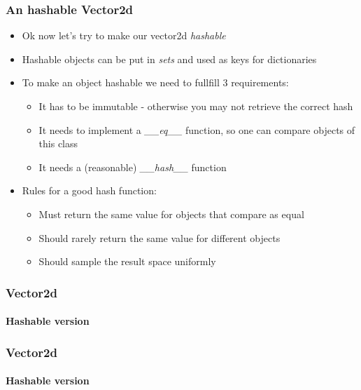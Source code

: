 \documentclass[9pt]{beamer}
\begin{document}
\begin{frame}
  \frametitle{An hashable Vector2d}

  \begin{itemize}
    \item Ok now let's try to make our vector2d \emph{hashable}
    \medskip
    \item Hashable objects can be put in \emph{sets} and used as keys for
          dictionaries
    \medskip
    \item To make an object hashable we need to fullfill 3 requirements:
    \smallskip
    \begin{itemize}
      \item It has to be immutable - otherwise you may not retrieve the correct hash
      \smallskip
      \item It needs to implement a \emph{\_\_eq\_\_} function, so one can compare
            objects of this class
      \smallskip
      \item It needs a (reasonable) \emph{\_\_hash\_\_} function
    \end{itemize}
    \medskip
    \item Rules for a good hash function:
    \smallskip
    \begin{itemize}
      \item Must return the same value for objects that compare as equal
      \smallskip
      \item Should rarely return the same value for different objects
      \smallskip
      \item Should sample the result space uniformly
    \end{itemize}

  \end{itemize}

\end{frame}


\begin{frame}
  \frametitle{Vector2d}
  \framesubtitle{Hashable version}
  
\end{frame}


\begin{frame}
  \frametitle{Vector2d}
  \framesubtitle{Hashable version}
  
\end{frame}
\end{document}
